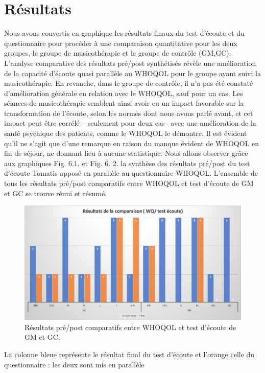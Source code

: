    \chapter{Résultats}
   Nous avons convertis en graphique les résultats finaux du test d'écoute et du questionnaire pour 
   procéder à une comparaison quantitative pour les deux groupes, le groupe de 
   musicothérapie et le groupe de contrôle (GM,GC).
   \\
   L'analyse comparative des résultats pré/post synthétisés révèle une amélioration 
   de la capacité d'écoute quasi parallèle au WHOQOL pour le groupe ayant suivi la musicothérapie. En 
   revanche, dans le groupe de contrôle, il n'a pas été constaté d'amélioration générale en relation avec le 
   WHOQOL, sauf pour un cas. Les 
   séances de  
   musicothérapie semblent  ainsi avoir 
   eu un impact favorable sur la transformation de l'écoute, selon les normes dont nous avons parlé 
   avant, et cet impact peut être corrélé -- seulement  pour  deux cas-- avec une amélioration de la 
   santé 
   psychique des 
   patients, comme le WHOQOL le démontre. Il est évident qu'il ne s'agit que d'une remarque en raison du 
   manque évident de WHOQOL en fin de séjour, ne donnant  lieu à aucune statistique. Nous allons 
   observer 
   grâce aux
   graphiques Fig. 6.1. et Fig. 6. 2. la synthèse des résultats pré/post du test d'écoute Tomatis apposé en 
   parallèle au questionnaire WHOQOL.
     L'ensemble de tous les résultats pré/post comparatifs entre WHOQOL et test 
     d'écoute de  
     GM et GC se trouve réuni et résumé.
    \begin{figure}
    	\centering
    	\includegraphics[width=0.7\columnwidth]{images/graphiques/comparatifWQecoute.png}
    	\caption[Comparatif résultats pré/post]{Résultats pré/post comparatifs entre WHOQOL et test 
    	d'écoute de  
    	GM et GC.}
    \end{figure}
    \clearpage
    La colonne bleue représente le résultat final 
    du test d'écoute et l'orange celle du questionnaire : les deux sont mis en parallèle 
